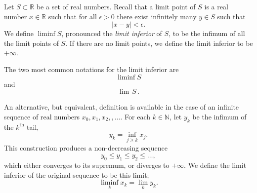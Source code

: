 \documentclass[12pt]{article}
\newcommand{\reals}{\mathbb{R}}
\newcommand{\natnums}{\mathbb{N}}
\newcommand{\supth}{^{\text{th}}}
\begin{document}
Let $S\subset\reals$ be a set of real numbers.  Recall that a limit
point of $S$ is a real number $x\in\reals$ such that for all
$\epsilon>0$ there exist infinitely many $y\in S$ such that
$$\vert x-y\vert <\epsilon.$$
We define $\liminf S$, pronounced the
{\em limit inferior} of $S$, to be the infimum of all the limit
points of $S$.  If there are no limit points, we define the limit
inferior to be $+\infty$.

The two most common notations for the limit inferior are 
$$\liminf S$$ and
$$\underline{\lim}\, S\,.$$

An alternative, but equivalent, definition is available in the case of
an infinite sequence of real numbers $x_0, x_1, x_2, ,\ldots$.  For
each $k\in\natnums$, let $y_k$ be the infimum of the $k\supth$ tail,
$$y_k = \inf_{j\geq k} x_j .$$
This construction produces a
non-decreasing sequence
$$y_0 \leq y_1 \leq y_2 \leq \ldots,$$
which either converges to its supremum, or diverges to $+\infty$.
We define the limit inferior of the original sequence to be this limit;
$$\liminf_{k} x_k = \lim_k y_k.$$
\end{document}
